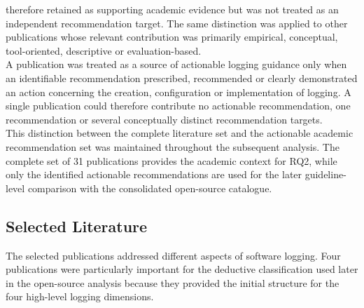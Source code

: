 therefore retained as supporting academic evidence but was not treated as an
independent recommendation target. The same distinction was applied to other
publications whose relevant contribution was primarily empirical, conceptual,
tool-oriented, descriptive or evaluation-based.
\\
A publication was treated as a source of actionable logging guidance only when an
identifiable recommendation prescribed, recommended or clearly demonstrated an
action concerning the creation, configuration or implementation of logging. A
single publication could therefore contribute no actionable recommendation, one
recommendation or several conceptually distinct recommendation targets.
\\
This distinction between the complete literature set and the actionable academic
recommendation set was maintained throughout the subsequent analysis. The complete
set of 31 publications provides the academic context for RQ2, while only the
identified actionable recommendations are used for the later guideline-level
comparison with the consolidated open-source catalogue.


\subsection{Selected Literature}

The selected publications addressed different aspects of software logging. Four
publications were particularly important for the deductive classification used later
in the open-source analysis because they provided the initial structure for the four
high-level logging dimensions.

